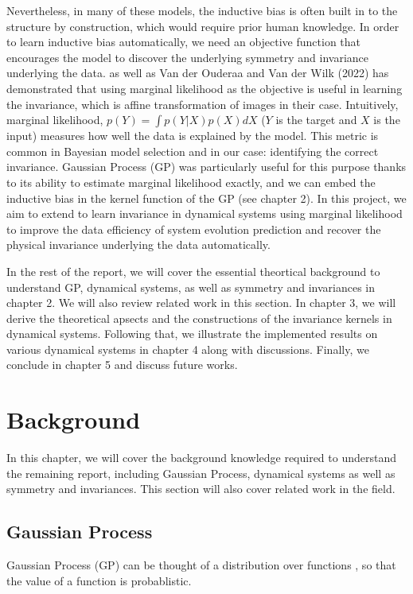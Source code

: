 \documentclass{statsmsc}
\begin{document}
Nevertheless, in many of these models, the inductive bias is often built in to the structure by construction, which would require prior human knowledge.
In order to learn inductive bias automatically, we need an objective function that encourages the model to discover the underlying symmetry and invariance underlying the data. 
\cite{Mark2017} as well as Van der Ouderaa and Van der Wilk (2022) has demonstrated that using marginal likelihood as the objective is useful in learning the invariance, which is affine transformation of images in their case.
Intuitively, marginal likelihood, $p(Y)=\int p(Y|X)p(X)dX$ ($Y$ is the target and $X$ is the input) measures how well the data is explained by the model.
This metric is common in Bayesian model selection and in our case: identifying the correct invariance. 
Gaussian Process (GP) was particularly useful for this purpose thanks to its ability to estimate marginal likelihood exactly, and we can embed the inductive bias in the kernel function of the GP (see chapter 2).
In this project, we aim to extend \cite{Mark2017} to learn invariance in dynamical systems using marginal likelihood to improve the data efficiency of system evolution prediction and recover the physical invariance underlying the data automatically. 

In the rest of the report, we will cover the essential theortical background to understand GP, dynamical systems, as well as symmetry and invariances in chapter 2. We will also review related work in this section.
In chapter 3, we will derive the theoretical apsects and the constructions of the invariance kernels in dynamical systems.
Following that, we illustrate the implemented results on various dynamical systems in chapter 4 along with discussions.
Finally, we conclude in chapter 5 and discuss future works.

 
\chapter{Background}
In this chapter, we will cover the background knowledge required to understand the remaining report, including Gaussian Process, dynamical systems as well as symmetry and invariances. 
This section will also cover related work in the field.

\section{Gaussian Process}
Gaussian Process (GP) can be thought of a distribution over functions \citep{rasmussen_williams_2006}, so that the value of a function is probablistic.
\end{document}
